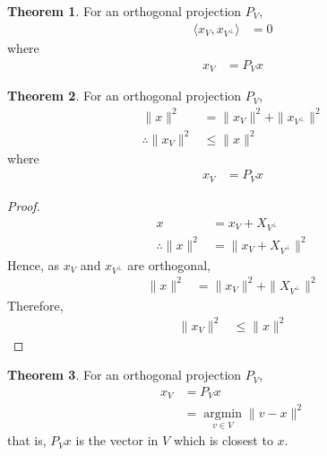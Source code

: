 \documentclass[titlepage, fleqn, a4paper, 12pt, twoside]{article}
\theoremstyle{definition}
\theoremstyle{theorem}
\newtheorem{theorem}{Theorem}
\DeclareMathOperator{\argmin}{\mathrm{argmin}}
\begin{document}
\begin{theorem}
	For an orthogonal projection $P_V$,
	\begin{align*}
		\langle x_V , x_{V^{\perp}} \rangle &= 0
	\end{align*}
	where
	\begin{align*}
		x_V &= P_V x
	\end{align*}
\end{theorem}

\begin{theorem}
	For an orthogonal projection $P_V$,
	\begin{align*}
		\|x\|^2 &= \|x_V\|^2 + \|x_{V^{\perp}}\|^2\\
		\therefore \|x_V\|^2 &\le \|x\|^2
	\end{align*}
	where
	\begin{align*}
		x_V &= P_V x
	\end{align*}
\end{theorem}

\begin{proof}
	\begin{align*}
		x &= x_V + X_{V^{\perp}}\\
		\therefore \|x\|^2 &= \|x_V + X_{V^{\perp}}\|^2
	\end{align*}
	Hence, as $x_V$ and $x_{V^{\perp}}$ are orthogonal,
	\begin{align*}
		\|x\|^2 &= \|x_V\|^2 + \|X_{V^{\perp}}\|^2
	\end{align*}
	Therefore,
	\begin{align*}
		\|x_V\|^2 &\le \|x\|^2
	\end{align*}
\end{proof}

\begin{theorem}
	For an orthogonal projection $P_V$,
	\begin{align*}
		x_V &= P_V x\\
		&= \argmin\limits_{v \in V} \|v - x\|^2
	\end{align*}
	that is, $P_V x$ is the vector in $V$ which is closest to $x$.
\end{theorem}
\end{document}

